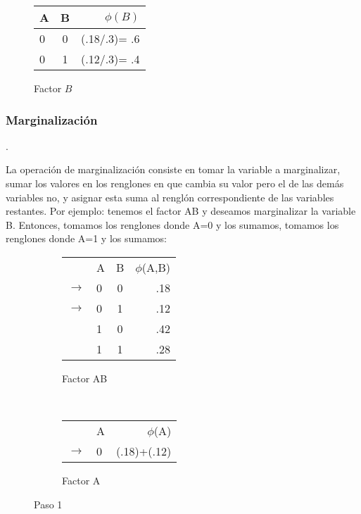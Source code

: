 \begin{figure}[H]
  \begin{center}
    \begin{tabular}{ l  c | r }
      A & B &  \(\phi(B)\)\\ \hline
      0 & 0 & (.18/.3)= .6  \\ \hline
      0 & 1 & (.12/.3)= .4 \\
    \end{tabular}
  \end{center}
  \caption{Factor \(B\)}
\end{figure}


\subsubsection{Marginalización}
 \parencite[297]{KollerFriedman2009}.

La operación de marginalización consiste en tomar la variable a marginalizar, sumar los valores en los renglones en que cambia su valor pero el de las demás variables no, y asignar esta suma al renglón correspondiente de las variables restantes. Por ejemplo: tenemos el factor AB y deseamos marginalizar la variable B. Entonces, tomamos los renglones donde A=0 y los sumamos, tomamos los renglones donde A=1 y los sumamos:

\begin{figure}[H]
    \centering
    \begin{subfigure}[b]{0.4\textwidth}
        \centering
        \begin{tabular}{ l l  c | r }
           & A & B & $\phi$(A,B)\\ \cline{2-4}
          \(\to\) & 0 & 0 & .18  \\ \cline{2-4}
          \(\to\) & 0 & 1 & .12  \\ \cline{2-4}
           & 1 & 0 & .42  \\ \cline{2-4}
           & 1 & 1 & .28  \\
        \end{tabular}
        \caption{Factor AB}
    \end{subfigure}
    ~ 
    \begin{subfigure}[b]{0.4\textwidth}
        \centering
        \begin{tabular}{l  l | r }
            & A & $\phi$(A)\\ \cline{2-3}
        \(\to\) & 0 & (.18)+(.12)  \\
        \end{tabular}
        \caption{Factor A}
    \end{subfigure}
    \caption{Paso 1}
\end{figure}

